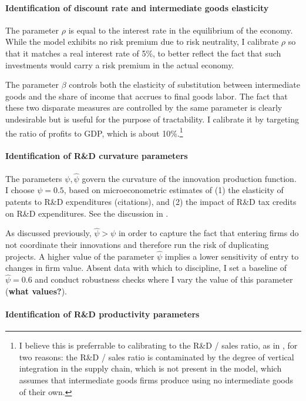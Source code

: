 \documentclass[12pt,english]{article}
\theoremstyle{remark}
\begin{document}
\paragraph{Identification of discount rate and intermediate goods elasticity}

The parameter $\rho$ is equal to the interest rate in the equilibrium of the economy. While the model exhibits no risk premium due to risk neutrality, I calibrate $\rho$ so that it matches a real interest rate of 5\%, to better reflect the fact that such investments would carry a risk premium in the actual economy. 

The parameter $\beta$ controls both the elasticity of substitution between intermediate goods and the share of income that accrues to final goods labor. The fact that these two disparate measures are controlled by the same parameter is clearly undesirable but is useful for the purpose of tractability. I calibrate it by targeting the ratio of profits to GDP, which is about 10\%.\footnote{I believe this is preferrable to calibrating to the R\&D / sales ratio, as in \cite{akcigit_growth_2018}, for two reasons: the R\&D / sales ratio is contaminated by the degree of vertical integration in the supply chain, which is not present in the model, which assumes that intermediate goods firms produce using no intermediate goods of their own.}

\paragraph{Identification of R\&D curvature parameters}

The parameters $\psi, \hat{\psi}$ govern the curvature of the innovation production function. I choose $\psi = 0.5$, based on microeconometric estimates of (1) the elasticity of patents to R\&D expenditures (citations), and (2) the impact of R\&D tax credits on R\&D expenditures. See the discussion in \cite{akcigit_growth_2018}. 

As discussed previously, $\hat{\psi} > \psi$ in order to capture the fact that entering firms do not coordinate their innovations and therefore run the risk of duplicating projects. A higher value of the parameter $\hat{\psi}$ implies a lower sensitivity of entry to changes in firm value. Absent data with which to discipline, I set a baseline of $\hat{\psi} = 0.6$ and conduct robustness checks where I vary the value of this parameter (\textbf{what values?}).

\paragraph{Identification of R\&D productivity parameters}
\end{document}
